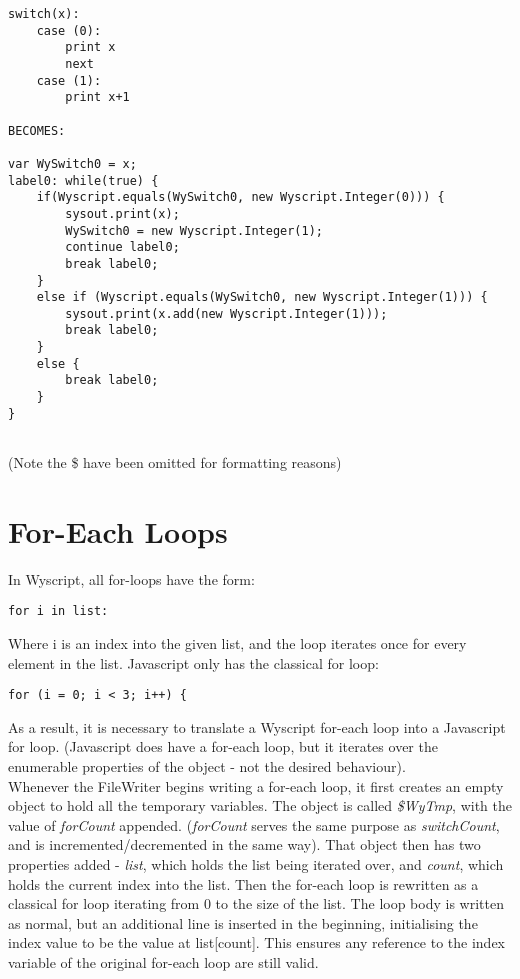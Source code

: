 \begin{lstlisting}
switch(x):
    case (0):
        print x
        next
    case (1):
        print x+1

BECOMES:

var WySwitch0 = x;
label0: while(true) {
    if(Wyscript.equals(WySwitch0, new Wyscript.Integer(0))) {
        sysout.print(x);
        WySwitch0 = new Wyscript.Integer(1);
        continue label0;
        break label0;
    }
    else if (Wyscript.equals(WySwitch0, new Wyscript.Integer(1))) {
        sysout.print(x.add(new Wyscript.Integer(1)));
        break label0;
    }
    else {
        break label0;
    }
}
    
\end{lstlisting}
(Note the \$ have been omitted for formatting reasons)


\section{For-Each Loops}
\label{c_control_foreach}

In Wyscript, all for-loops have the form:
\begin{lstlisting}
for i in list:
\end{lstlisting}
Where i is an index into the given list, and the loop iterates once for every element in the list. Javascript only has the classical for loop:
\begin{lstlisting}
for (i = 0; i < 3; i++) {
\end{lstlisting}
As a result, it is necessary to translate a Wyscript for-each loop into a Javascript for loop. (Javascript does have a for-each loop, but it iterates over the enumerable properties of the object - not the desired behaviour).\\

Whenever the FileWriter begins writing a for-each loop, it first creates an empty object to hold all the temporary variables. The object is called {\em \$WyTmp}, with the value of {\em forCount} appended. ({\em forCount} serves the same purpose as {\em switchCount}, and is incremented/decremented in the same way). That object then has two properties added - {\em list}, which holds the list being iterated over, and {\em count}, which holds the current index into the list. Then the for-each loop is rewritten as a classical for loop iterating from 0 to the size of the list. The loop body is written as normal, but an additional line is inserted in the beginning, initialising the index value to be the value at list[count]. This ensures any reference to the index variable of the original for-each loop are still valid. \pagebreak

